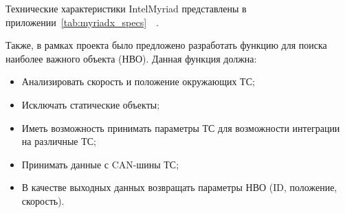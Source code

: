 Технические характеристики IntelMyriad представлены в приложении~\ref{tab:myriadx_specs}~\cite{Intel_MyriadX_ProductBrief_2018}~\cite{Oh_2017_MyriadX_AnandTech}.

Также, в рамках проекта было предложено разработать функцию для поиска наиболее важного объекта (НВО). Данная функция должна:

\begin{itemize}
    \item Анализировать скорость и положение окружающих ТС;
    \item Исключать статические объекты;
    \item Иметь возможность принимать параметры ТС для возможности интеграции на различные ТС;
    \item Принимать данные с CAN-шины ТС;
    \item В качестве выходных данных возвращать параметры НВО (ID, положение, скорость).
\end{itemize}
